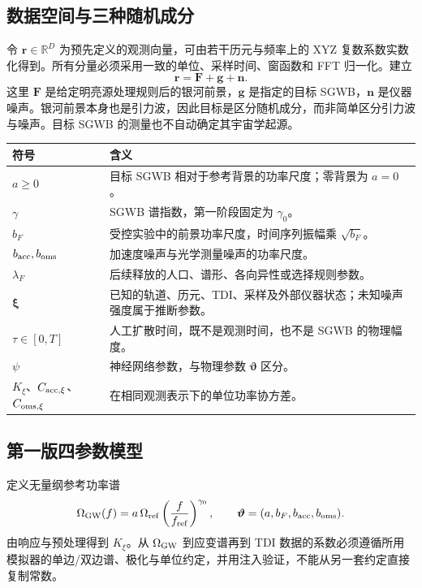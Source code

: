 \documentclass[UTF8,fontset=fandol,a4paper,11pt]{ctexart}
\numberwithin{equation}{section}
\newcommand{\btheta}{\boldsymbol\vartheta}
\newcommand{\bxi}{\boldsymbol\xi}
\newcommand{\br}{\boldsymbol r}
\newcommand{\bF}{\boldsymbol F}
\newcommand{\bn}{\boldsymbol n}
\newcommand{\bg}{\boldsymbol g}
\begin{document}
\subsection{数据空间与三种随机成分}
令 $\br\in\mathbb R^D$ 为预先定义的观测向量，可由若干历元与频率上的 XYZ 复数系数实数化得到。所有分量必须采用一致的单位、采样时间、窗函数和 FFT 归一化。建立
\begin{equation}
\br=\bF+\bg+\bn.
\label{eq:data}
\end{equation}
这里 $\bF$ 是给定明亮源处理规则后的银河前景，$\bg$ 是指定的目标 SGWB，$\bn$ 是仪器噪声。银河前景本身也是引力波，因此目标是区分随机成分，而非简单区分引力波与噪声。目标 SGWB 的测量也不自动确定其宇宙学起源。

\par\noindent\begin{minipage}{\linewidth}\centering
\begin{tabular}{P{2.5cm}P{12cm}}
\toprule 符号 & 含义\\\midrule
$a\geq0$ & 目标 SGWB 相对于参考背景的功率尺度；零背景为 $a=0$。\\
$\gamma$ & SGWB 谱指数，第一阶段固定为 $\gamma_0$。\\
$b_F$ & 受控实验中的前景功率尺度，时间序列振幅乘 $\sqrt{b_F}$。\\
$b_{\rm acc},b_{\rm oms}$ & 加速度噪声与光学测量噪声的功率尺度。\\
$\lambda_F$ & 后续释放的人口、谱形、各向异性或选择规则参数。\\
$\bxi$ & 已知的轨道、历元、TDI、采样及外部仪器状态；未知噪声强度属于推断参数。\\
$\tau\in[0,T]$ & 人工扩散时间，既不是观测时间，也不是 SGWB 的物理幅度。\\
$\psi$ & 神经网络参数，与物理参数 $\btheta$ 区分。\\
$K_\xi$、$C_{{\rm acc},\xi}$、$C_{{\rm oms},\xi}$ & 在相同观测表示下的单位功率协方差。\\\bottomrule
\end{tabular}
\end{minipage}\par\smallskip

\subsection{第一版四参数模型}
定义无量纲参考功率谱
\begin{equation}
\Omega_{\rm GW}(f)=a\,\Omega_{\rm ref}
\left(\frac{f}{f_{\rm ref}}\right)^{\gamma_0},\qquad
\btheta=(a,b_F,b_{\rm acc},b_{\rm oms}).
\end{equation}
由响应与预处理得到 $K_\xi$。从 $\Omega_{\rm GW}$ 到应变谱再到 TDI 数据的系数必须遵循所用模拟器的单边/双边谱、极化与单位约定，并用注入验证，不能从另一套约定直接复制常数。
\end{document}
